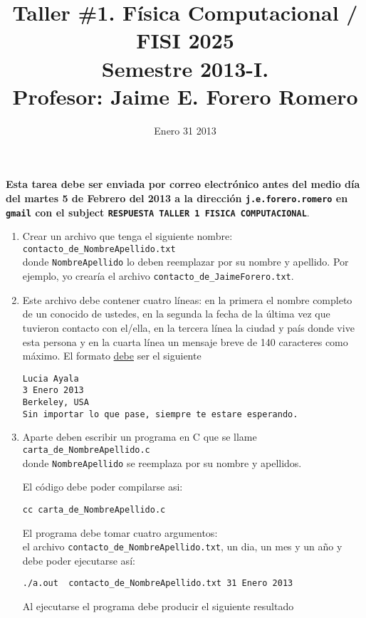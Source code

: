 \documentclass{article}
\title{Taller \#1. F\'isica Computacional / FISI 2025 \\Semestre 2013-I. \\ Profesor: Jaime E. Forero Romero}
\date{Enero 31 2013}
\begin{document}
\maketitle

{\bf Esta tarea debe ser enviada por correo electr\'onico antes del medio d\'ia del martes 5 de Febrero del 2013 a la direcci\'on {\tt j.e.forero.romero} en {\tt gmail} con el subject \verb"RESPUESTA TALLER 1 FISICA COMPUTACIONAL"}.

\begin{enumerate}
\item
Crear un archivo que tenga el siguiente nombre:\\
\verb"contacto_de_NombreApellido.txt"\\
donde \verb"NombreApellido" lo deben reemplazar por su nombre y apellido. Por ejemplo, yo crear\'ia el archivo \verb"contacto_de_JaimeForero.txt".

\item
Este archivo debe contener cuatro l\'ineas: en la primera el nombre completo de un conocido de ustedes, en la segunda la fecha de la \'ultima vez que tuvieron contacto con el/ella, en la tercera l\'inea la ciudad y pa\'is donde vive esta persona y en la cuarta l\'inea un mensaje breve de 140 caracteres como m\'aximo.
El formato \underline{debe} ser el siguiente

\begin{verbatim}
Lucia Ayala
3 Enero 2013
Berkeley, USA
Sin importar lo que pase, siempre te estare esperando.
\end{verbatim}

\item
Aparte deben escribir un programa en C que se llame\\ \verb"carta_de_NombreApellido.c"\\ donde \verb"NombreApellido" se reemplaza por su nombre y apellidos. 

El c\'odigo debe poder compilarse asi:
\begin{verbatim}
cc carta_de_NombreApellido.c
\end{verbatim}


El programa debe tomar cuatro argumentos:\\
 el archivo \verb"contacto_de_NombreApellido.txt", un dia, un mes y un a\~no y debe poder ejecutarse as\'i:
\begin{verbatim}
./a.out  contacto_de_NombreApellido.txt 31 Enero 2013
\end{verbatim}

Al ejecutarse el programa debe producir el siguiente resultado


\end{enumerate}
\end{document}
